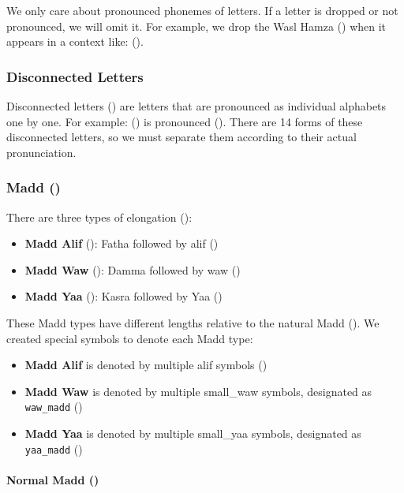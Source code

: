 


We only care about pronounced phonemes of letters. If a letter is dropped or not pronounced, we will omit it. For example, we drop the Wasl Hamza () when it appears in a context like: ().

\subsubsection{Disconnected Letters}

Disconnected letters () are letters that are pronounced as individual alphabets one by one. For example: () is pronounced (). There are 14 forms of these disconnected letters, so we must separate them according to their actual pronunciation.

\subsubsection{Madd ()}

There are three types of elongation ():
\begin{itemize}
	\item \textbf{Madd Alif} (): Fatha followed by alif ()
	\item \textbf{Madd Waw} (): Damma followed by waw ()
	\item \textbf{Madd Yaa} (): Kasra followed by Yaa ()
\end{itemize}

These Madd types have different lengths relative to the natural Madd (). We created special symbols to denote each Madd type:

\begin{itemize}
	\item \textbf{Madd Alif} is denoted by multiple alif symbols ()
	\item \textbf{Madd Waw} is denoted by multiple small\_waw symbols, designated as \texttt{waw\_madd} ()
	\item \textbf{Madd Yaa} is denoted by multiple small\_yaa symbols, designated as \texttt{yaa\_madd} ()
\end{itemize}



\paragraph{Normal Madd ()}

